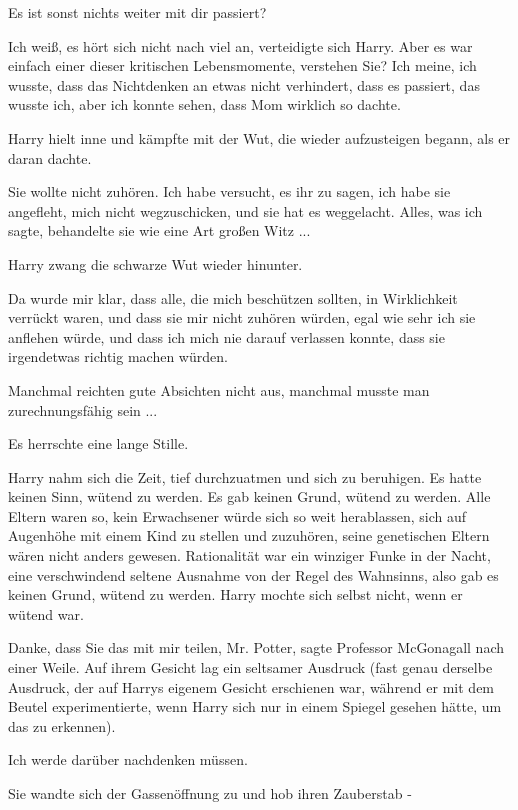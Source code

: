 \glqq{}Es ist sonst nichts weiter mit dir passiert?\grqq{}

\glqq{}Ich weiß, es hört sich nicht nach viel an\grqq{}, verteidigte sich Harry.
\glqq{}Aber es war einfach einer dieser kritischen Lebensmomente, verstehen Sie?
Ich meine, ich wusste, dass das Nichtdenken an etwas nicht verhindert, dass es
passiert, das wusste ich, aber ich konnte sehen, dass Mom wirklich so
dachte.\grqq{}

Harry hielt inne und kämpfte mit der Wut, die wieder aufzusteigen begann, als er
daran dachte.

\glqq{}Sie wollte nicht zuhören. Ich habe versucht, es ihr zu sagen, ich habe
sie angefleht, mich nicht wegzuschicken, und sie hat es weggelacht. Alles, was
ich sagte, behandelte sie wie eine Art großen Witz ...\grqq{}

Harry zwang die schwarze Wut wieder hinunter.

\glqq{}Da wurde mir klar, dass alle, die mich beschützen sollten, in
Wirklichkeit verrückt waren, und dass sie mir nicht zuhören würden, egal wie
sehr ich sie anflehen würde, und dass ich mich nie darauf verlassen konnte, dass
sie irgendetwas richtig machen würden.\grqq{}

Manchmal reichten gute Absichten nicht aus, manchmal musste man zurechnungsfähig
sein ...

Es herrschte eine lange Stille.

Harry nahm sich die Zeit, tief durchzuatmen und sich zu beruhigen. Es hatte
keinen Sinn, wütend zu werden. Es gab keinen Grund, wütend zu werden. Alle
Eltern waren so, kein Erwachsener würde sich so weit herablassen, sich auf
Augenhöhe mit einem Kind zu stellen und zuzuhören, seine genetischen Eltern
wären nicht anders gewesen. Rationalität war ein winziger Funke in der Nacht,
eine verschwindend seltene Ausnahme von der Regel des Wahnsinns, also gab es
keinen Grund, wütend zu werden. Harry mochte sich selbst nicht, wenn er wütend
war.

\glqq{}Danke, dass Sie das mit mir teilen, Mr. Potter\grqq{}, sagte Professor
McGonagall nach einer Weile. Auf ihrem Gesicht lag ein seltsamer Ausdruck (fast
genau derselbe Ausdruck, der auf Harrys eigenem Gesicht erschienen war, während
er mit dem Beutel experimentierte, wenn Harry sich nur in einem Spiegel gesehen
hätte, um das zu erkennen).

\glqq{}Ich werde darüber nachdenken müssen.\grqq{}

Sie wandte sich der Gassenöffnung zu und hob ihren Zauberstab -

